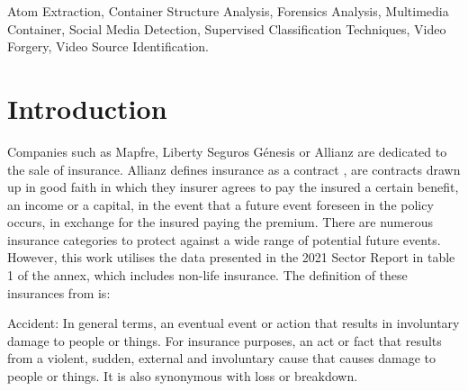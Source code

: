 \documentclass[review]{elsarticle}
\begin{document}
\begin{frontmatter}
\begin{abstract}
\end{abstract}

\begin{keyword}
Atom Extraction, Container Structure Analysis, Forensics Analysis, Multimedia Container, Social Media Detection, Supervised Classification Techniques, Video Forgery, Video Source Identification.
\end{keyword}

\end{frontmatter}

\section{Introduction}

Companies such as Mapfre, Liberty Seguros Génesis or Allianz are dedicated to the sale of insurance. Allianz defines insurance as a contract \cite{allianz2023seguros}, are contracts drawn up in good faith in which they insurer agrees to pay the insured a certain benefit, an income or a capital, in the event that a future event foreseen in the policy occurs, in exchange for the insured paying the premium.
There are numerous insurance categories to protect against a wide range of potential future events. However, this work utilises the data presented in the 2021 Sector Report \cite{dgsfp2022informe} in table 1 of the annex, which includes non-life insurance.
The definition of these insurances from \cite{mapfre2023diccionario} is:

Accident: In general terms, an eventual event or action that results in involuntary damage to people or things. For insurance purposes, an act or fact that results from a violent, sudden, external and involuntary cause that causes damage to people or things. It is also synonymous with loss or breakdown.
\end{document}
